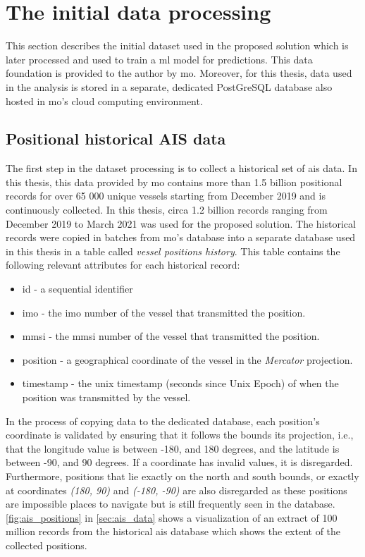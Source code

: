 \section{The initial data processing}

This section describes the initial dataset used in the proposed solution which is later processed and used to train a \acrshort{ml} model for predictions. This data foundation is provided to the author by \acrfull{mo}. Moreover, for this thesis, data used in the analysis is stored in a separate, dedicated PostGreSQL database also hosted in \acrshort{mo}'s cloud computing environment.

\subsection{Positional historical AIS data}

The first step in the dataset processing is to collect a historical set of \acrshort{ais} data. In this thesis, this data provided by \acrshort{mo} contains more than 1.5 billion positional records for over 65 000 unique vessels starting from December 2019 and is continuously collected. In this thesis, circa 1.2 billion records ranging from December 2019 to March 2021 was used for the proposed solution. The historical records were copied in batches from \acrshort{mo}'s database into a separate database used in this thesis in a table called \textit{vessel positions history}. This table contains the following relevant attributes for each historical record:

\begin{itemize}
    \item id - a sequential identifier
    \item imo - the \acrshort{imo} number of the vessel that transmitted the position.
    \item mmsi - the \acrshort{mmsi} number of the vessel that transmitted the position.
    \item position - a geographical coordinate of the vessel in the \textit{Mercator} projection.
    \item timestamp - the unix timestamp (seconds since Unix Epoch) of when the position was transmitted by the vessel.
\end{itemize}

In the process of copying data to the dedicated database, each position's coordinate is validated by ensuring that it follows the bounds its projection, i.e., that the longitude value is between -180, and 180 degrees, and the latitude is between -90, and 90 degrees. If a coordinate has invalid values, it is disregarded. Furthermore, positions that lie exactly on the north and south bounds, or exactly at coordinates \textit{(180, 90)} and \textit{(-180, -90)} are also disregarded as these positions are impossible places to navigate but is still frequently seen in the database. \cref{fig:ais_positions} in \cref{sec:ais_data} shows a visualization of an extract of 100 million records from the historical \acrshort{ais} database which shows the extent of the collected positions.

